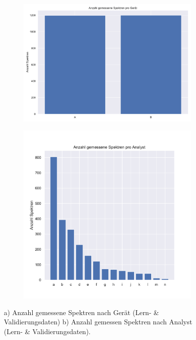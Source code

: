 \documentclass[11pt, a4paper]{article}
\begin{document}
\begin{figure}[h!]
    \centering
    \begin{subfigure}[c]{0.49\textwidth}
        \centering
        \includegraphics[width=\textwidth]{Figures/nr_measurementsdevices}
        \caption{}
    \end{subfigure}
    \begin{subfigure}[c]{0.49\textwidth}
        \centering
        \includegraphics[width=\textwidth]{Figures/analyst_plot}
        \caption{}
    \end{subfigure}
    \caption{a) Anzahl gemessene Spektren nach Gerät (Lern- \& Validierungsdaten) b) Anzahl gemessen Spektren nach Analyst (Lern- \& Validierungsdaten).}
\end{figure}
\end{document}

